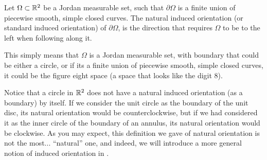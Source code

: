 \documentclass[11pt,a4paper]{article}
\begin{document}
\begin{definition}
  \label{def:natural-induced-orientation}
  Let $\Omega \subset \mathbb{R}^2$ be a Jordan measurable set,
  such that $\partial \Omega$ is a finite union of piecewise smooth,
  simple closed curves.
  The natural induced orientation (or standard induced orientation)
  of $\partial \Omega$, is the direction
  that requires $\Omega$ to be to the left when following along it.
\end{definition}
\begin{remark}
  This simply means that $\Omega$ is a Jordan measurable set,
  with boundary that could be either a circle, or if its a finite union
  of piecewise smooth, simple closed curves,
  it could be the figure eight space (a space that looks like the
  digit $8$).
\end{remark}
\begin{remark}
  \label{rmk:natural-orientation}
  Notice that a circle in $\mathbb{R}^2$ does not have a natural induced orientation
  (as a boundary)
  by itself.
  If we consider the unit circle as the boundary of the unit disc,
  its natural orientation would be counterclockwise,
  but if we had considered it as the inner circle of the boundary
  of an annulus, its natural orientation would be clockwise.
  As you may expect, this definition we gave of natural orientation
  is not the most... ``natural'' one, and indeed, we will introduce a more
  general notion of induced orientation in .
\end{remark}
\end{document}
